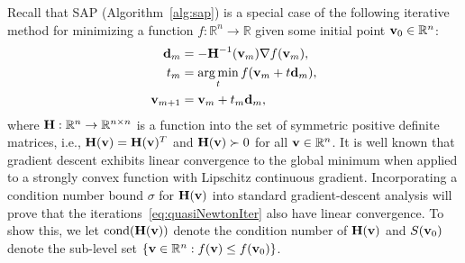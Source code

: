 Recall that SAP (Algorithm~\ref{alg:sap}) is a special case
of the following iterative method
for minimizing a function $f : \mathbb{R}^n \rightarrow
\mathbb{R}$ given some initial
point ${\mathbf{v}}_0 \in \mathbb{R}^n$:
\begin{align}\label{eq:quasiNewtonIter}
  \begin{aligned}
    \vd_m &= -\mf{H}^{-1}(\vx_m) \nabla f(\vx_m), \\
     t_m &= \argmin_{t} f(\vx_m + t \vd_m),\\
    \vx_{m+1} &= \vx_m + t_m \vd_m,      
  \end{aligned}
\end{align}
where ${\mathbf{H}} : \mathbb{R}^n \rightarrow \mathbb{R}^{n \times n}$ is a function 
into the set of symmetric positive definite matrices, i.e.,  ${\mathbf{H}}({\mathbf{v}}) = {\mathbf{H}}({\mathbf{v}})^T$ 
and ${\mathbf{H}}({\mathbf{v}}) \succ 0$ for all ${\mathbf{v}}\in\mathbb{R}^n$.  
It is well known that gradient descent exhibits linear convergence to the global minimum when applied to a strongly convex
function with Lipschitz continuous gradient. Incorporating
a condition number bound  $\sigma$ for ${\mathbf{H}}({\mathbf{v}})$  into standard gradient-descent analysis
will prove that the iterations~\eqref{eq:quasiNewtonIter}
also have linear convergence.
To show this, we let
$\text{cond}({\mathbf{H}}({\mathbf{v}}))$ denote the condition number of ${\mathbf{H}}({\mathbf{v}})$
and $S({\mathbf{v}}_0)$ denote the sub-level set $\{ {\mathbf{v}} \in \mathbb{R}^n: f({\mathbf{v}}) \le f({\mathbf{v}}_0) \}$.
